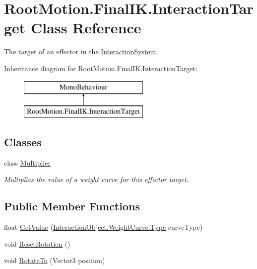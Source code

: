 \hypertarget{class_root_motion_1_1_final_i_k_1_1_interaction_target}{}\section{Root\+Motion.\+Final\+I\+K.\+Interaction\+Target Class Reference}
\label{class_root_motion_1_1_final_i_k_1_1_interaction_target}


The target of an effector in the \mbox{\hyperlink{class_root_motion_1_1_final_i_k_1_1_interaction_system}{Interaction\+System}}.  


Inheritance diagram for Root\+Motion.\+Final\+I\+K.\+Interaction\+Target\+:\begin{figure}[H]
\begin{center}
\leavevmode
\includegraphics[height=2.000000cm]{class_root_motion_1_1_final_i_k_1_1_interaction_target}
\end{center}
\end{figure}
\subsection*{Classes}
\begin{DoxyCompactItemize}
\item 
class \mbox{\hyperlink{class_root_motion_1_1_final_i_k_1_1_interaction_target_1_1_multiplier}{Multiplier}}
\begin{DoxyCompactList}\small\item\em Multiplies the value of a weight curve for this effector target. \end{DoxyCompactList}\end{DoxyCompactItemize}
\subsection*{Public Member Functions}
\begin{DoxyCompactItemize}
\item 
float \mbox{\hyperlink{class_root_motion_1_1_final_i_k_1_1_interaction_target_ab6685ed16287fbda1f35f0a4a656ce45}{Get\+Value}} (\mbox{\hyperlink{class_root_motion_1_1_final_i_k_1_1_interaction_object_1_1_weight_curve_a74c8be2e80ace86b130c88e275300b27}{Interaction\+Object.\+Weight\+Curve.\+Type}} curve\+Type)
\item 
void \mbox{\hyperlink{class_root_motion_1_1_final_i_k_1_1_interaction_target_ad12044ac58c437ad6ac440fc6e36df1e}{Reset\+Rotation}} ()
\item 
void \mbox{\hyperlink{class_root_motion_1_1_final_i_k_1_1_interaction_target_a2defe70ebefa8e54f20149967572da21}{Rotate\+To}} (Vector3 position)
\end{DoxyCompactItemize}
